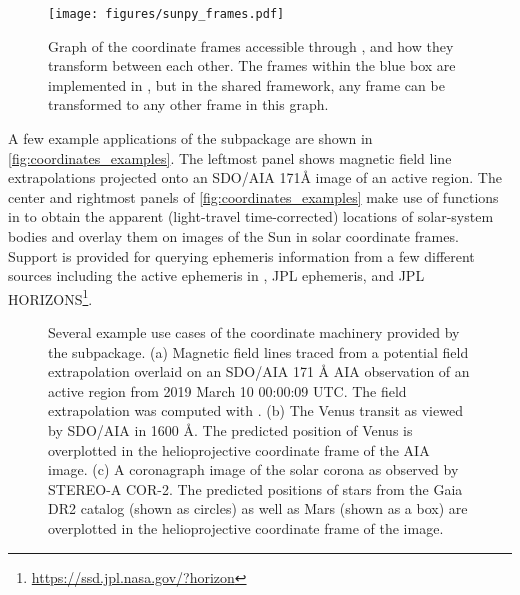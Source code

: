 \begin{figure}
    \centering
    \texttt{[image: figures/sunpy\_frames.pdf]}
    \caption{Graph of the coordinate frames accessible through , and how they transform between each other.
    The frames within the blue box are implemented in , but in the shared framework, any frame can be transformed to any other frame in this graph.}
    \label{fig:transform_graph}
\end{figure}

A few example applications of the  subpackage are shown in \autoref{fig:coordinates_examples}.
The leftmost panel shows magnetic field line extrapolations projected onto an SDO/AIA 171\AA{} image of an active region.
The center and rightmost panels of \autoref{fig:coordinates_examples} make use of functions in  to obtain the apparent (light-travel time-corrected) locations of solar-system bodies and overlay them on images of the Sun in solar coordinate frames.
Support is  provided for querying ephemeris information from a few different sources including the active ephemeris in , JPL ephemeris, and JPL HORIZONS\footnote{\url{https://ssd.jpl.nasa.gov/?horizon}}.

\begin{figure}
    \caption{Several example use cases of the coordinate machinery provided by the  subpackage.
    (a) Magnetic field lines traced from a potential field extrapolation overlaid on an SDO/AIA 171 \AA{} AIA observation of an active region from 2019 March 10 00:00:09 UTC.
    The field extrapolation was computed with  \citep{david_stansby_2019_3237053}.
    (b) The Venus transit as viewed by SDO/AIA in 1600 \AA. The predicted position of Venus is overplotted in the helioprojective coordinate frame of the AIA image.
    (c) A coronagraph image of the solar corona as observed by STEREO-A COR-2. The predicted positions of stars from the Gaia DR2 catalog (shown as circles) as well as Mars (shown as a box) are overplotted in the helioprojective coordinate frame of the image.}
    \label{fig:coordinates_examples}
\end{figure}
